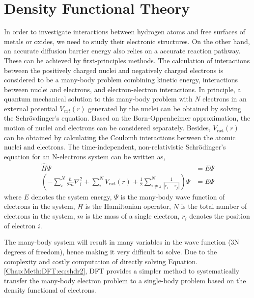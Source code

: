 \section{Density Functional Theory}
\label{Chap:Mech:DFT}

In order to investigate interactions between hydrogen atoms and free surfaces of metals or oxides, we need to study their electronic structures. On the other hand, an accurate diffusion barrier energy also relies on a accurate reaction pathway. These can be achieved by first-principles methods. The calculation of interactions between the positively charged nuclei and negatively charged electrons is considered to be a many-body problem combining kinetic energy, interactions between nuclei and electrons, and electron-electron interactions. In principle, a quantum mechanical solution to this many-body problem with $N$ electrons in an external potential $V_{ext}(r)$ generated by the nuclei can be obtained by solving the Schr\"{o}vdinger’s equation. Based on the Born-Oppenheimer approximation, the motion of nuclei and electrons can be considered separately. Besides, $V_{ext}(r)$ can be obtained by calculating the Coulomb interactions between the atomic nuclei and electrons. The time-independent, non-relativistic Schr\"{o}dinger's equation for an N-electrons system can be written as,
\begin{subequations}
\begin{align}
\hat{H}\Psi & = E\Psi \label{Chap:Meth:DFT:eq:shdr1} \\
(-\sum_i^N \frac{\hbar}{2m}\nabla_i^2 + \sum_i^N V_{ext}(r) + \frac{1}{2}\sum_{i \neq j}^N\frac{1}{|r_i - r_j|}) \Psi & = E \Psi \label{Chap:Meth:DFT:eq:shdr2}
\end{align}
\end{subequations}
where $E$ denotes the system energy, $\Psi$ is the many-body wave function of electrons in the system, $\hat{H}$ is the Hamiltonian operator, $N$ is the total number of electrons in the system, $m$ is the mass of a single electron, $r_i$ denotes the position of electron $i$.


The many-body system will result in many variables in the wave function (3N degrees of freedom), hence making it very difficult to solve. Due to the complexity and costly computation of directly solving Equation. \ref{Chap:Meth:DFT:eq:shdr2}, \acf{DFT} provides a simpler method to systematically transfer the many-body electron problem to a single-body problem based on the density functional of electrons. \cite{wilson1984electron, kohn1965self}
